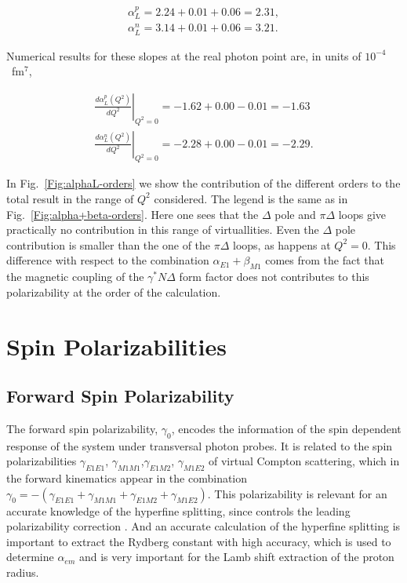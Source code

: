 \documentclass[prc,twocolumn,showpacs,preprintnumbers,amsmath,amssymb
,superscriptaddress,a4paper,nofootinbib
]{revtex4-1}
\begin{document}
\begin{align}
\alpha^p_L= 2.24+ 0.01+  0.06=2.31, \\
\alpha^n_L= 3.14 + 0.01+ 0.06 = 3.21.
\end{align}


Numerical results for these slopes at the real photon point are, in units of $10^{-4}$~fm$^7$,


\begin{align}
\left.\frac{d\alpha^p_L (Q^2)}{dQ^2}\right|_{Q^2=0}=  -1.62 + 0.00 - 0.01 = -1.63  \\
\left.\frac{d\alpha^n_L (Q^2)}{dQ^2}\right|_{Q^2=0}= -2.28 + 0.00 - 0.01 = -2.29.
\end{align}

In Fig.~\ref{Fig:alphaL-orders} we show the contribution of the different orders to the total result in the range of $Q^2$ considered. 
The legend is the same as in Fig.~\ref{Fig:alpha+beta-orders}. 
Here one sees that the $\Delta$ pole and $\pi \Delta$ loops give practically no contribution in this range of virtuallities.
Even the $\Delta$ pole contribution is smaller than the one of the $\pi \Delta$ loops, as happens at $Q^2=0$. 
This difference with respect to the combination $\alpha_{E1}+\beta_{M1}$ comes from the fact that the magnetic coupling of the $\gamma^* N \Delta$ form factor does not contributes to this polarizability at the order of the calculation.







\section{Spin Polarizabilities}
\label{Sec:Spin-Pol}

\subsection{Forward Spin Polarizability}
\label{Sec:ForwardSpinPolarizability}

The forward spin polarizability, $\gamma_0$, encodes the information of the spin dependent response of the system under transversal photon probes. 
It is related to the spin polarizabilities $\gamma_{E1E1}$, $\gamma_{M1M1}$,$\gamma_{E1M2}$, $\gamma_{M1E2}$ of virtual Compton scattering, which in the forward kinematics appear in the combination $\gamma_0=-(\gamma_{E1E1} + \gamma_{M1M1} + \gamma_{E1M2}+\gamma_{M1E2})$. 
This polarizability is relevant for an accurate knowledge of the hyperfine splitting, since controls the leading polarizability correction \cite{Carlson:2008ke}. 
And an accurate calculation of the hyperfine splitting is important to extract the Rydberg constant with high accuracy, which is used to determine $\alpha_{em}$ and is very important for the Lamb shift extraction of the proton radius.
\end{document}
